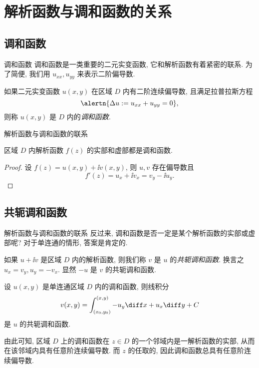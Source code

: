 \section{解析函数与调和函数的关系}


\subsection{调和函数}

\begin{frame}{调和函数}
	\onslide<+->
	调和函数是一类重要的二元实变函数, 它和解析函数有着紧密的联系.
	\onslide<+->
	为了简便, 我们用 $u_{xx},u_{yy}$ 来表示二阶偏导数.

	\onslide<+->
	\begin{definition}
		如果二元实变函数 $u(x,y)$ 在区域 $D$ 内有二阶连续偏导数, 且满足拉普拉斯方程
	\[
		\alertn{\Delta u:=u_{xx}+u_{yy}=0},
	\]
		则称 $u(x,y)$ 是 $D$ 内的\emph{调和函数}.
	\end{definition}
\end{frame}


\begin{frame}{解析函数与调和函数的联系}
	\onslide<+->
	\begin{theorem}
		区域 $D$ 内解析函数 $f(z)$ 的实部和虚部都是调和函数.
	\end{theorem}

	\onslide<+->
	\begin{proof}
		设 $f(z)=u(x,y)+\ii v(x,y)$, 则 $u,v$ 存在偏导数且
			\[f'(z)=u_x+\ii v_x=v_y-\ii u_y.
	\]
		\onslide<+->{可知
			\[\Delta u=u_{xx}+u_{yy}=v_{yx}-v_{xy}=0,\]}
			\bigdel
		\onslide<+->{
			\[\Delta v=v_{xx}+v_{yy}=-u_{yx}+u_{xy}=0.\qedhere\]}
		\bigdel
	\end{proof}
\end{frame}


\subsection{共轭调和函数}
\begin{frame}{解析函数与调和函数的联系}
	\onslide<+->
	反过来, 调和函数是否一定是某个解析函数的实部或虚部呢?
	\onslide<+->
	对于单连通的情形, 答案是肯定的.

	\onslide<+->
	如果 $u+\ii v$ 是区域 $D$ 内的解析函数, 则我们称 $v$ 是 $u$ 的\emph{共轭调和函数}.
	\onslide<+->
	换言之 $u_x=v_y,u_y=-v_x$.
	\onslide<+->
	显然 $-u$ 是 $v$ 的共轭调和函数.
	\onslide<+->
	\begin{theorem}
		设 $u(x,y)$ 是单连通区域 $D$ 内的调和函数, 则线积分
	\[
		v(x,y)=\int_{(x_0,y_0)}^{(x,y)}-u_y\diff x+u_x\diff y+C
	\]
		是 $u$ 的共轭调和函数.
	\end{theorem}
	\onslide<+->
	由此可知, 区域 $D$ 上的调和函数在 $z\in D$ 的一个邻域内是一解析函数的实部, 从而在该邻域内具有任意阶连续偏导数.
	\onslide<+->
	而 $z$ 的任取的, 因此调和函数总具有任意阶连续偏导数.
\end{frame}


